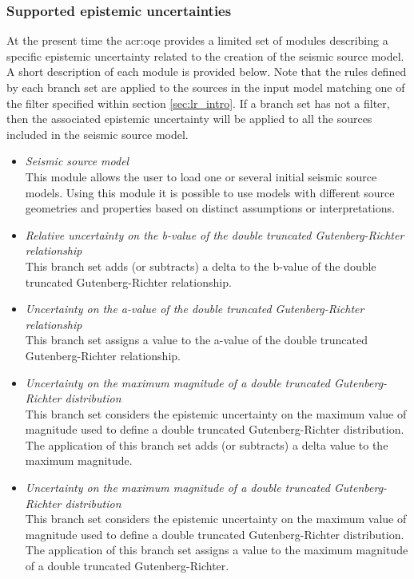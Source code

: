 \subsubsection{Supported epistemic uncertainties}
At the present time the \gls{acr:oqe} provides a limited set of modules 
describing a specific epistemic uncertainty related to the creation of 
the seismic source model.
%
A short description of each module is provided below. Note that 
the rules defined by each branch set are applied to the sources 
in the input model matching one of the filter specified within
section \ref{sec:lr_intro}. 
%
If a branch set has not a filter, then the associated epistemic 
uncertainty will be applied to all the sources included in the 
seismic source model.
%
\begin{itemize}
    \item \emph{Seismic source model} \hfill \\
        This module allows the user to load one or several initial seismic 
        source models. Using this module it is possible to use models
        with different source geometries and properties based on distinct 
        assumptions or interpretations.
    \item \emph{Relative uncertainty on the b-value of the double truncated 
        Gutenberg-Richter relationship} \hfill \\
        This branch set adds (or subtracts) a delta to the b-value of the 
        double truncated Gutenberg-Richter relationship.
    \item \emph{Uncertainty on the a-value of the double 
        truncated Gutenberg-Richter relationship} \hfill \\ 
        This branch set assigns a value to the a-value of the double truncated 
        Gutenberg-Richter relationship.
    \item \emph{Uncertainty on the maximum magnitude of a double 
        truncated Gutenberg-Richter distribution} \hfill \\ 
        This branch set considers the epistemic uncertainty on the maximum 
        value of magnitude used to define a double truncated Gutenberg-Richter 
        distribution. The application of this branch set adds 
        (or subtracts) a delta value to the maximum magnitude.
   \item \emph{Uncertainty on the maximum magnitude of a double 
        truncated Gutenberg-Richter distribution} \hfill \\ 
        This branch set considers the epistemic uncertainty on the maximum 
        value of magnitude used to define a double truncated Gutenberg-Richter 
        distribution. The application of this branch set  
        assigns a value to the maximum magnitude of a double truncated 
        Gutenberg-Richter.
\end{itemize}
